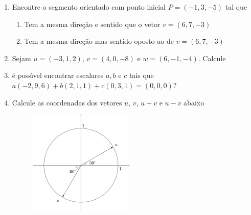 \documentclass[a4paper,5pt]{amsbook}
\begin{document}
\begin{enumerate}
	\vspace{0.5cm}
	\item Encontre o segmento orientado com ponto inicial $P = (-1, 3, -5)$ tal
		que
		\begin{enumerate}
			\item Tem a mesma dire\c{c}\~ao e sentido que o vetor $v = (6, 7, -3)$
			\item Tem a mesma dire\c{c}\~ao mas sentido oposto ao de $v = (6, 7, -3)$
		\end{enumerate}

	\vspace{0.5cm}
	\item Sejam $u = (-3, 1, 2)$, $v = (4, 0, -8)$ e $w = (6, -1, -4)$. Calcule


	\vspace{0.5cm}
	\item \'e poss\'{\i}vel encontrar escalares $a, b$ e $c$ tais que
		$a(-2,9,6)+b(2,1,1)+c(0,3,1)=(0,0,0)$?

	\vspace{0.5cm}
	\item Calcule as coordenadas dos vetores $u$, $v$, $u+v$ e $u-v$ abaixo
		\begin{figure}[h]
			\centering
			\includegraphics[width=5cm]{fig/lista5_1.pdf}
		\end{figure}


\end{enumerate}
\end{document}
